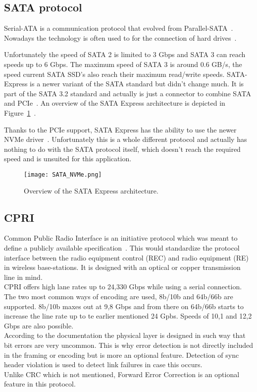 \subsection{SATA protocol}
	Serial-ATA is a communication protocol that evolved from Parallel-SATA~\cite{SATA_Specifications}. Nowadays the technology is often used to for the connection of hard drives~\cite{SATATech}.
	
	Unfortunately the speed of SATA 2 is limited to 3 Gbps and SATA 3 can reach speeds up to 6 Gbps. The maximum speed of SATA 3 is around 0.6 GB/s, the speed current SATA SSD's also reach their maximum read/write speeds.
	SATA-Express is a newer variant of the SATA standard but didn't change much. It is part of the SATA 3.2 standard and actually is just a connector to combine SATA and PCIe~\cite{SATA_E}. An overview of the SATA Express architecture is depicted in Figure~\ref{Fig:SATA_Express_Architecture}~\cite{SATA_E2}.
	
	Thanks to the PCIe support, SATA Express has the ability to use the newer NVMe driver~\cite{SATA_E2}. Unfortunately this is a whole different protocol and actually has nothing to do with the SATA protocol itself, which doesn't reach the required speed and is unsuited for this application.
	
	\begin{figure}[H]
		\centering
		\texttt{[image: SATA\_NVMe.png]}	
		\caption{Overview of the SATA Express architecture.}
		\label{Fig:SATA_Express_Architecture}
	\end{figure}
\newpage


\subsection{CPRI} 
	Common Public Radio Interface is an initiative protocol which was meant to define a publicly available specification~\cite{CPRI_Specification}. This would standardize the protocol interface between the radio equipment control (REC) and radio equipment (RE) in wireless base-stations. It is designed with an optical or copper transmission line in mind. \\
	
	CPRI offers high lane rates up to 24,330 Gbps while using a serial connection. The two most common ways of encoding are used, 8b/10b and 64b/66b are supported. 8b/10b maxes out at 9,8 Gbps and from there on 64b/66b starts to increase the line rate up to te earlier mentioned 24 Gpbs. Speeds of 10,1 and 12,2 Gbps are also possible.\\
	According to the documentation the physical layer is designed in such way that bit errors are very uncommon. This is why error detection is not directly included in the framing or encoding but is more an optional feature. Detection of sync header violation is used to detect link failures in case this occurs.\\
	Unlike CRC which is not mentioned, Forward Error Correction is an optional feature in this protocol.
	
